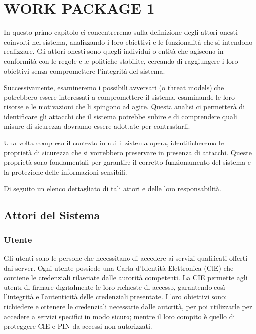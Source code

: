\chapter{WORK PACKAGE 1}
In questo primo capitolo ci concentreremo sulla definizione degli attori onesti coinvolti nel sistema, analizzando i loro obiettivi e le funzionalità che si intendono realizzare.
Gli attori onesti sono quegli individui o entità che agiscono in conformità con le regole e le politiche stabilite, cercando di raggiungere i loro obiettivi senza compromettere l'integrità del sistema.

Successivamente, esamineremo i possibili avversari (o threat models) che potrebbero essere interessati a compromettere il sistema, esaminando le loro risorse e le motivazioni che li spingono ad agire.
Questa analisi ci permetterà di identificare gli attacchi che il sistema potrebbe subire e di comprendere quali misure di sicurezza dovranno essere adottate per contrastarli.

Una volta compreso il contesto in cui il sistema opera, identificheremo le proprietà di sicurezza che si vorrebbero preservare in presenza di attacchi.
Queste proprietà sono fondamentali per garantire il corretto funzionamento del sistema e la protezione delle informazioni sensibili.

\noindent Di seguito un elenco dettagliato di tali attori e delle loro responsabilità.

\section{Attori del Sistema}

    \subsection{Utente}
        Gli utenti sono le persone che necessitano di accedere ai servizi qualificati offerti dai server.
        Ogni utente possiede una Carta d'Identità Elettronica (CIE) che contiene le credenziali rilasciate dalle autorità competenti.
        La CIE permette agli utenti di firmare digitalmente le loro richieste di accesso, garantendo così l'integrità e l'autenticità delle credenziali presentate.
         I loro obiettivi sono: richiedere e ottenere le credenziali necessarie dalle autorità, per poi utilizzarle per accedere a servizi specifici in modo sicuro; mentre il loro compito è quello di proteggere CIE e PIN da accessi non autorizzati.

    
